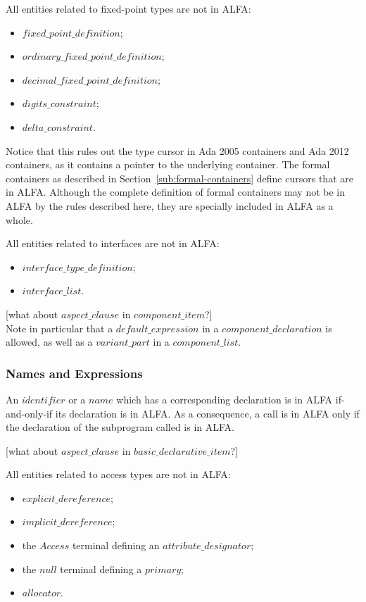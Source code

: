 \documentclass[fullpage]{article}
\newcommand{\bnf}[1]{$\mathit{#1}$}
\begin{document}
All entities related to fixed-point types are not in ALFA:
\begin{itemize}
\item \bnf{fixed\_point\_definition};
\item \bnf{ordinary\_fixed\_point\_definition};
\item \bnf{decimal\_fixed\_point\_definition};
\item \bnf{digits\_constraint};
\item \bnf{delta\_constraint}.
\end{itemize}

Notice that this rules out the type cursor in Ada 2005 containers and Ada 2012
containers, as it contains a pointer to the underlying container. The formal
containers as described in Section~\ref{sub:formal-containers} define cursors
that are in ALFA. Although the complete definition of formal containers may not
be in ALFA by the rules described here, they are specially included in ALFA as
a whole.

All entities related to interfaces are not in ALFA:
\begin{itemize}
\item \bnf{interface\_type\_definition};
\item \bnf{interface\_list}.
\end{itemize}

[what about \bnf{aspect\_clause} in \bnf{component\_item}?]\\

Note in particular that a \bnf{default\_expression} in a
\bnf{component\_declaration} is allowed, as well as a \bnf{variant\_part} in
a \bnf{component\_list}.

\subsubsection{Names and Expressions}

An \bnf{identifier} or a \bnf{name} which has a corresponding declaration is in
ALFA if-and-only-if its declaration is in ALFA. As a consequence, a call is in
ALFA only if the declaration of the subprogram called is in ALFA. 

[what about \bnf{aspect\_clause} in \bnf{basic\_declarative\_item}?]

All entities related to access types are not in ALFA:
\begin{itemize}
\item \bnf{explicit\_dereference};
\item \bnf{implicit\_dereference};
\item the \bnf{Access} terminal defining an \bnf{attribute\_designator};
\item the \bnf{null} terminal defining a \bnf{primary};
\item \bnf{allocator}.
\end{itemize}
\end{document}
